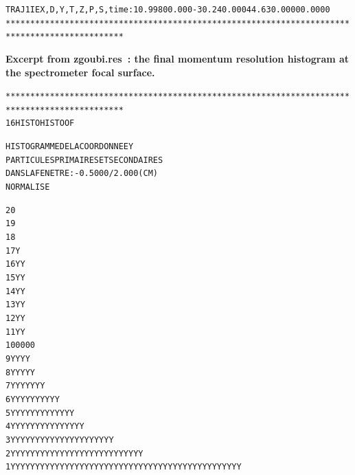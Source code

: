 \begin{tiny}
\begin{center}
\begin{alltt}
 TRAJ 1 IEX,D,Y,T,Z,P,S,time :  1  0.9980   0.000  -30.24  0.000  44.63   0.0000   0.0000    
**********************************************************************************************

\end{alltt}


\noindent \textbf{\normalsize Excerpt from zgoubi.res~: 
the final momentum resolution histogram at the spectrometer focal surface.}
\begin{alltt}
**********************************************************************************************
     16  HISTO       HISTO     OF      
                        
                      HISTOGRAMME  DE  LA  COORDONNEE  Y     
                      PARTICULES  PRIMAIRES  ET  SECONDAIRES
                      DANS  LA  FENETRE :  -0.5000     /    2.000     (CM) 
                      NORMALISE     

   20                                                                                                
   19                                                                                                
   18                                                                                        
   17                                              Y                                         
   16                                              Y         Y                               
   15                                              Y         Y                               
   14                                              Y         Y                               
   13                                              Y         Y                               
   12                                              Y         Y                               
   11                                              Y         Y                               
   10                                   0          0         0         0                     
    9                                   Y          Y         Y         Y                     
    8                                   Y          Y         YY        Y                     
    7                                   Y         YY         YY        YY                    
    6                       Y          YYY        YY         YY        YY                    
    5                       YY         YYY        YY         YY       YYYY                   
    4                       YY Y       YYY        YYY        YY       YYYY                   
    3                       YY YY     YYYYY       YYY       YYYY      YYYYY                  
    2                      YYYYYY     YYYYYY     YYYY       YYYYY     YYYYYY                 
    1                     YYYYYYYYYYYYYYYYYYYYYYYYYYYYYYY YYYYYYYY   YYYYYYYY         


\end{alltt}
\end{center}
\end{tiny}
